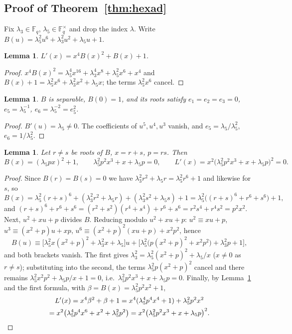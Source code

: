 \documentclass[12pt,a4paper]{amsart}
\newtheorem{lemma}[theorem]{Lemma}
\theoremstyle{definition}
\newcommand{\F}{\mathbb{F}}
\begin{document}
\subsection{Proof of Theorem~\ref{thm:hexad}}
Fix $\lambda_3\in\F_q$, $\lambda_5\in\F_q^\times$ and drop the index $\lambda$. Write $B(u)=\lambda_5^2u^6+\lambda_3^2u^2+\lambda_5u+1$.

\begin{lemma}\label{lem:identity}
$L'(x)=x^4B(x)^2+B(x)+1$.
\end{lemma}
\begin{proof}
$x^4B(x)^2=\lambda_5^4x^{16}+\lambda_3^4x^8+\lambda_5^2x^6+x^4$ and $B(x)+1=\lambda_5^2x^6+\lambda_3^2x^2+\lambda_5x$; the terms $\lambda_5^2x^6$ cancel.
\end{proof}

\begin{lemma}\label{lem:separable}
$B$ is separable, $B(0)=1$, and its roots satisfy $e_1=e_2=e_3=0$, $e_5=\lambda_5^{-1}$, $e_6=\lambda_5^{-2}=e_5^2$.
\end{lemma}
\begin{proof}
$B'(u)=\lambda_5\ne0$. The coefficients of $u^5,u^4,u^3$ vanish, and $e_5=\lambda_5/\lambda_5^2$, $e_6=1/\lambda_5^2$.
\end{proof}

\begin{lemma}\label{lem:pairsum}
Let $r\ne s$ be roots of $B$, $x=r+s$, $p=rs$. Then
\[
B(x)=(\lambda_5px)^2+1,\qquad \lambda_5^2p^2x^3+x+\lambda_5p=0,\qquad L'(x)=x^2\bigl(\lambda_5^2p^2x^3+x+\lambda_5p\bigr)^2=0 .
\]
\end{lemma}
\begin{proof}
Since $B(r)=B(s)=0$ we have $\lambda_3^2r^2+\lambda_5r=\lambda_5^2r^6+1$ and likewise for $s$, so
\[
B(x)=\lambda_5^2(r+s)^6+(\lambda_3^2r^2+\lambda_5r)+(\lambda_3^2s^2+\lambda_5s)+1=\lambda_5^2\bigl((r+s)^6+r^6+s^6\bigr)+1 ,
\]
and $(r+s)^6+r^6+s^6=(r^2+s^2)(r^4+s^4)+r^6+s^6=r^2s^4+r^4s^2=p^2x^2$. Next, $u^2+xu+p$ divides $B$. Reducing modulo $u^2+xu+p$: $u^2\equiv xu+p$, $u^3\equiv(x^2+p)u+xp$, $u^6\equiv(x^2+p)^2(xu+p)+x^2p^2$, hence
\[
B(u)\equiv\bigl[\lambda_5^2x(x^2+p)^2+\lambda_3^2x+\lambda_5\bigr]u+\bigl[\lambda_5^2\bigl(p(x^2+p)^2+x^2p^2\bigr)+\lambda_3^2p+1\bigr],
\]
and both brackets vanish. The first gives $\lambda_3^2=\lambda_5^2(x^2+p)^2+\lambda_5/x$ ($x\ne0$ as $r\ne s$); substituting into the second, the terms $\lambda_5^2p(x^2+p)^2$ cancel and there remains $\lambda_5^2x^2p^2+\lambda_5p/x+1=0$, i.e.\ $\lambda_5^2p^2x^3+x+\lambda_5p=0$. Finally, by Lemma~\ref{lem:identity} and the first formula, with $\beta=B(x)=\lambda_5^2p^2x^2+1$,
\begin{multline*}
L'(x)=x^4\beta^2+\beta+1=x^4(\lambda_5^4p^4x^4+1)+\lambda_5^2p^2x^2\\
=x^2\bigl(\lambda_5^4p^4x^6+x^2+\lambda_5^2p^2\bigr)=x^2\bigl(\lambda_5^2p^2x^3+x+\lambda_5p\bigr)^2 .\qedhere
\end{multline*}
\end{proof}
\end{document}
